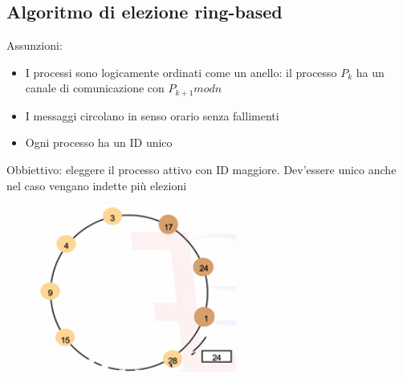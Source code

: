 \documentclass[12pt,italian]{report}
\begin{document}
\subsection{Algoritmo di elezione ring-based}
Assunzioni:
\begin{itemize}
    \item I processi sono logicamente ordinati come un anello: il processo $P_k$ ha un canale di comunicazione con $P_{k+1}modn$
    \item I messaggi circolano in senso orario senza fallimenti
    \item Ogni processo ha un ID unico
\end{itemize}
Obbiettivo: eleggere il processo attivo con ID maggiore. Dev'essere unico anche nel caso vengano indette più elezioni
\begin{figure}[h]
\centering
\includegraphics[width=65mm]{img/elering.png}
\end{figure}
\end{document}
